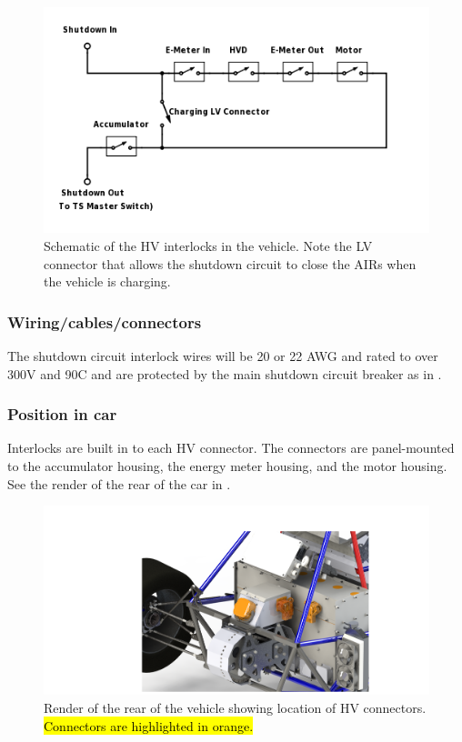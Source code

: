 \documentclass{article}
\DeclareRobustCommand{\hlr}[1]{{\sethlcolor{pink}\hl{#1}}}
\begin{document}
\begin{figure}[H]
\centering
\includegraphics[width = .75\textwidth]{HV-connector-schematic.png}
\caption{Schematic of the HV interlocks in the vehicle. Note the LV connector that allows the shutdown circuit to close the AIRs when the vehicle is charging.}
\label{fig:HV_connector_schematic}
\end{figure}

\subsubsection{Wiring/cables/connectors}
The shutdown circuit interlock wires will be 20 or 22 AWG and rated to over 300V and 90\textdegree C and are protected by the main shutdown circuit breaker as in . 

\subsubsection{Position in car}
Interlocks are built in to each HV connector. The connectors are panel-mounted to the accumulator housing, the energy meter housing, and the motor housing. See the render of the rear of the car in .

\begin{figure}[H]
\centering
\includegraphics[width = .75\textwidth]{EnergyMeterBackISO}
\caption{Render of the rear of the vehicle showing location of HV connectors. \hlr{Connectors are highlighted in orange.} }
\label{fig:rear_of_car}
\end{figure}
\end{document}
